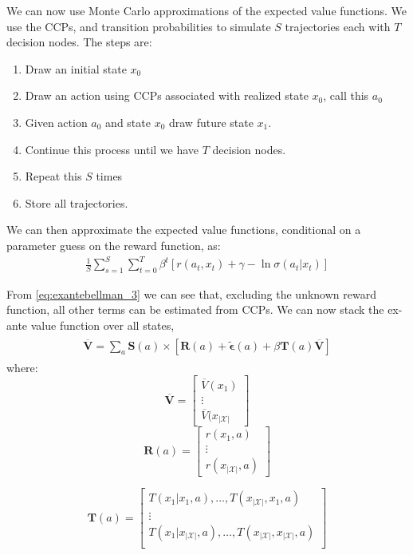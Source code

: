\documentclass{article}
\begin{document}
We can now use Monte Carlo approximations of the expected value functions. We use the CCPs, and transition probabilities to simulate $S$ trajectories each with $T$ decision nodes. The steps are:
\begin{enumerate}
    \item Draw an initial state $x_0$
    \item Draw an action using CCPs associated with realized state $x_0$, call this $a_0$
    \item Given action $a_0$ and state $x_0$ draw future state $x_1$. 
    \item Continue this process until we have $T$ decision nodes.
    \item Repeat this $S$ times
    \item Store all trajectories.
\end{enumerate}
We can then approximate the expected value functions, conditional on a parameter guess on the reward function, as:
\begin{eqnarray}
\frac{1}{S}\sum_{s=1}^S\sum_{t=0}^T\beta^t [r(a_t,x_t)+\gamma-\ln \sigma(a_t|x_t)]
\end{eqnarray}


From \eqref{eq:exantebellman_3} we can see that, excluding the unknown reward function, all other terms can be estimated from CCPs. We can now stack the ex-ante value function over all states,
\begin{align} \label{eq:exantebellman_4}
    \begin{split}
    \overline{\mathbf{V}}=\sum_{a}\mathbf{S}(a) \times \left[\mathbf{R}(a)+\tilde{\bm{\epsilon}}(a)+\beta \mathbf{T}(a) \overline{\mathbf{V}}\right]
    \end{split}
\end{align}
where:
\[
\overline{\mathbf{V}}=\left[\begin{array}{c}\overline{V}(x_1)\\\vdots\\\overline{V}(x_{|\mathcal{X}|}\end{array}\right]
\]
\[
\mathbf{R}(a)=\left[\begin{array}{c}r(x_1,a)\\\vdots\\ r(x_{|\mathcal{X}|},a)\end{array}\right]
\]

\[
\mathbf{T}(a)=\left[\begin{array}{ccc}
T(x_1|x_1,a),\dots,T(x_{|\mathcal{X}|},x_1,a)\\
\vdots\\
T(x_1|x_{|\mathcal{X}|},a),\dots,T(x_{|\mathcal{X}|},x_{|\mathcal{X}|},a)\\
\end{array}\right]
\]
\end{document}
